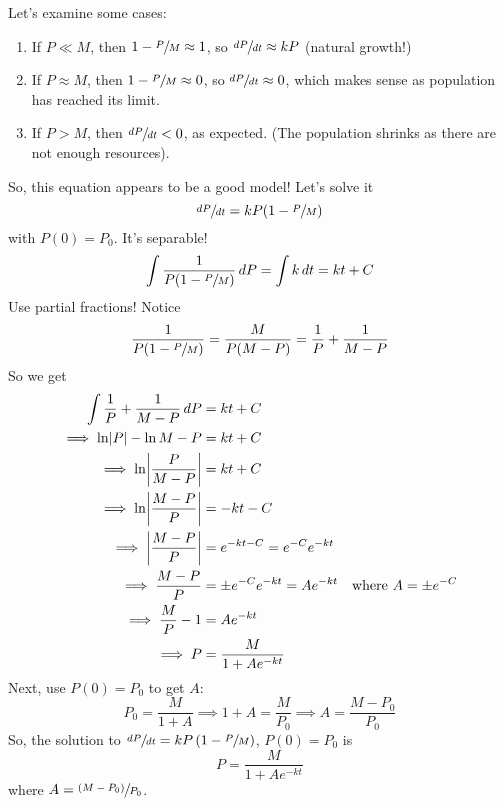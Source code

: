 Let's examine some cases:
\begin{enumerate}
    \item If $ P\ll M $, then $ 1-\sfrac{P}{M}\approx 1 $, so $ \sfrac{dP}{dt} \approx kP $
          (natural growth!)
    \item If $ P\approx M $, then $ 1-\sfrac{P}{M}\approx 0 $, so $ \sfrac{dP}{dt}\approx 0 $,
          which makes sense as population has reached its limit.
    \item If $ P>M $, then $ \sfrac{dP}{dt} <0 $, as expected. (The population
          shrinks as there are not enough resources).
\end{enumerate}
So, this equation appears to be a good model! Let's solve it
\[ \sfrac{dP}{dt} =kP(1-\sfrac{P}{M}) \]
with $ P(0)=P_0 $. It's separable!
\[ \int \frac{1}{P(1-\sfrac{P}{M})} \, d{P}=\int k\, d{t} =kt+C \]
Use partial fractions! Notice
\[ \frac{1}{P(1-\sfrac{P}{M})}=\frac{M}{P(M-P)} =\frac{1}{P} +\frac{1}{M-P} \]
So we get
\begin{align*}
    \int \frac{1}{P} +\frac{1}{M-P} \, d{P} & =kt+C                                                   \\
    \implies  \ln\abs{P}-\ln{M-P}           & =kt+C                                                   \\
    \implies  \ln\abs*{\frac{P}{M-P}}       & =kt+C                                                   \\
    \implies \ln\abs*{\frac{M-P}{P}}        & =-kt-C                                                  \\
    \implies  \abs*{\frac{M-P}{P}}          & =e^{-kt-C}=e^{-C}e^{-kt}                                \\
    \implies  \frac{M-P}{P}                 & =\pm e^{-C}e^{-kt}=Ae^{-kt} & \text{where }A=\pm e^{-C} \\
    \implies  \frac{M}{P} -1                & =Ae^{-kt}                                               \\
    \implies  P                             & =\frac{M}{1+Ae^{-kt}}
\end{align*}
Next, use $ P(0)=P_0 $ to get $ A $:
\[ P_0=\frac{M}{1+A}\implies 1+A=\frac{M}{P_0}\implies A=\frac{M-P_0}{P_0}  \]
So, the solution to $ \sfrac{dP}{dt}=kP\left( 1-\sfrac{P}{M} \right) $, $ P(0)=P_0 $
is
\[ P=\frac{M}{1+Ae^{-kt}}  \]
where $ A=\sfrac{(M-P_0)}{P_0} $.

